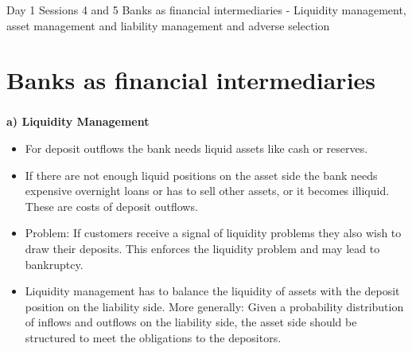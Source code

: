 \documentclass[11pt]{beamer}
\begin{document}



%

\begin{frame}
\begin{center}
 Day 1 Sessions 4 and 5
 Banks as financial intermediaries - Liquidity management, asset management and liability management and  adverse selection
\end{center}
\end{frame}

%
\section{Banks as financial intermediaries}
%


\begin{frame}
\frametitle{\insertsection}

\textbf{a) Liquidity Management}

\begin{itemize}
\item For deposit outflows the bank needs liquid assets like cash or reserves.

\item If there are not enough liquid positions on the asset side the bank needs expensive overnight loans or has to sell other assets, or it becomes illiquid. These are costs of deposit outflows.

\item Problem: If customers receive a signal of liquidity problems they also wish to draw their deposits. This enforces the liquidity problem and may lead to bankruptcy.

\item Liquidity management has to balance the liquidity of assets with the deposit position on the liability side. More generally: Given a probability distribution of inflows and outflows on the liability side, the asset side should be structured to meet the obligations to the depositors.
\end{itemize}
\end{frame}

\end{document}
